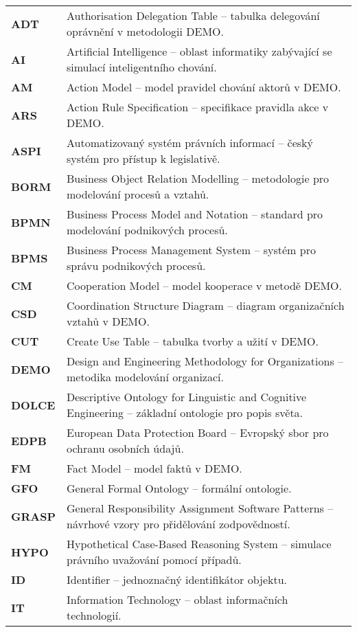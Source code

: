 \documentclass[czech,bachelor,unicode,oneside]{ctufit-thesis}
\begin{document}
\begin{longtable}{p{2.5cm}p{9.5cm}}

\textbf{ADT} & Authorisation Delegation Table – tabulka delegování oprávnění v metodologii DEMO. \\
\textbf{AI} & Artificial Intelligence – oblast informatiky zabývající se simulací inteligentního chování. \\
\textbf{AM} & Action Model – model pravidel chování aktorů v DEMO. \\
\textbf{ARS} & Action Rule Specification – specifikace pravidla akce v DEMO. \\
\textbf{ASPI} & Automatizovaný systém právních informací – český systém pro přístup k legislativě. \\
\textbf{BORM} & Business Object Relation Modelling – metodologie pro modelování procesů a vztahů. \\
\textbf{BPMN} & Business Process Model and Notation – standard pro modelování podnikových procesů. \\
\textbf{BPMS} & Business Process Management System – systém pro správu podnikových procesů. \\
\textbf{CM} & Cooperation Model – model kooperace v metodě DEMO. \\
\textbf{CSD} & Coordination Structure Diagram – diagram organizačních vztahů v DEMO. \\
\textbf{CUT} & Create Use Table – tabulka tvorby a užití v DEMO. \\
\textbf{DEMO} & Design and Engineering Methodology for Organizations – metodika modelování organizací. \\
\textbf{DOLCE} & Descriptive Ontology for Linguistic and Cognitive Engineering – základní ontologie pro popis světa. \\
\textbf{EDPB} & European Data Protection Board – Evropský sbor pro ochranu osobních údajů. \\
\textbf{FM} & Fact Model – model faktů v DEMO. \\
\textbf{GFO} & General Formal Ontology – formální ontologie. \\
\textbf{GRASP} & General Responsibility Assignment Software Patterns – návrhové vzory pro přidělování zodpovědností. \\
\textbf{HYPO} & Hypothetical Case-Based Reasoning System – simulace právního uvažování pomocí případů. \\
\textbf{ID} & Identifier – jednoznačný identifikátor objektu. \\
\textbf{IT} & Information Technology – oblast informačních technologií. \\

\end{longtable}
\end{document}
